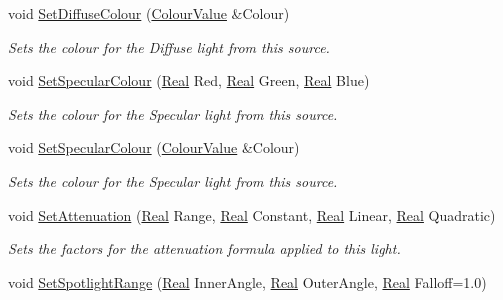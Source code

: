\begin{DoxyCompactItemize}
void \hyperlink{classphys_1_1Light_ac2e20bac2841e970f231d24d068e7b98}{SetDiffuseColour} (\hyperlink{classphys_1_1ColourValue}{ColourValue} \&Colour)
\begin{DoxyCompactList}\small\item\em Sets the colour for the Diffuse light from this source. \item\end{DoxyCompactList}\item 
void \hyperlink{classphys_1_1Light_a6f2f7b5745e455e7281f7c5e76766c1b}{SetSpecularColour} (\hyperlink{namespacephys_af7eb897198d265b8e868f45240230d5f}{Real} Red, \hyperlink{namespacephys_af7eb897198d265b8e868f45240230d5f}{Real} Green, \hyperlink{namespacephys_af7eb897198d265b8e868f45240230d5f}{Real} Blue)
\begin{DoxyCompactList}\small\item\em Sets the colour for the Specular light from this source. \item\end{DoxyCompactList}\item 
void \hyperlink{classphys_1_1Light_a3e3a407c7f4b26a8d2cd44b9013e8716}{SetSpecularColour} (\hyperlink{classphys_1_1ColourValue}{ColourValue} \&Colour)
\begin{DoxyCompactList}\small\item\em Sets the colour for the Specular light from this source. \item\end{DoxyCompactList}\item 
void \hyperlink{classphys_1_1Light_a22294ff531c0767bc83e7702954e1277}{SetAttenuation} (\hyperlink{namespacephys_af7eb897198d265b8e868f45240230d5f}{Real} Range, \hyperlink{namespacephys_af7eb897198d265b8e868f45240230d5f}{Real} Constant, \hyperlink{namespacephys_af7eb897198d265b8e868f45240230d5f}{Real} Linear, \hyperlink{namespacephys_af7eb897198d265b8e868f45240230d5f}{Real} Quadratic)
\begin{DoxyCompactList}\small\item\em Sets the factors for the attenuation formula applied to this light. \item\end{DoxyCompactList}\item 
void \hyperlink{classphys_1_1Light_a25c79247a42b49d04825bbc76977a134}{SetSpotlightRange} (\hyperlink{namespacephys_af7eb897198d265b8e868f45240230d5f}{Real} InnerAngle, \hyperlink{namespacephys_af7eb897198d265b8e868f45240230d5f}{Real} OuterAngle, \hyperlink{namespacephys_af7eb897198d265b8e868f45240230d5f}{Real} Falloff=1.0)

\end{DoxyCompactItemize}
